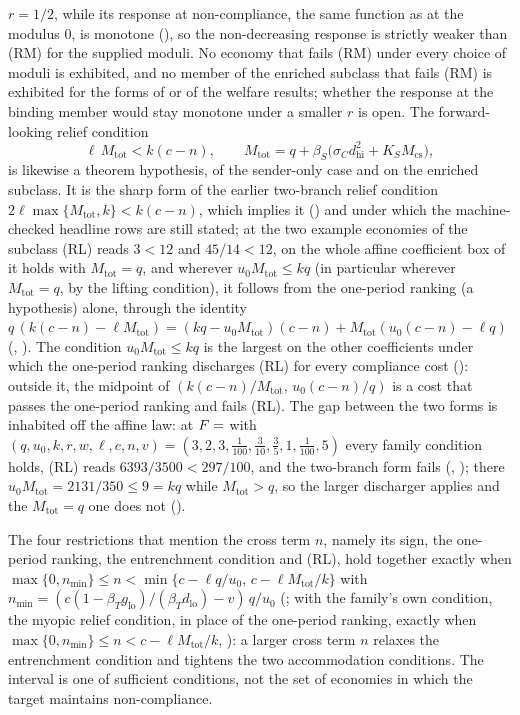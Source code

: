 $r=1/2$, while its response at non-compliance, the same function as at the modulus
$0$, is monotone (), so the
non-decreasing response is strictly weaker than (RM) for the supplied moduli.
No economy that fails (RM) under every choice of moduli is exhibited, and no
member of the enriched subclass that fails (RM) is exhibited for the forms of
 or of the welfare results; whether the response at the binding member would stay
monotone under a smaller $r$ is open. The forward-looking relief
condition
\[
\ell\,M_{\mathrm{tot}}<k(c-n),\qquad
M_{\mathrm{tot}}=q+\beta_S\bigl(\sigma_Cd_{\mathrm{hi}}^2+K_SM_{\mathrm{cs}}\bigr),
\tag{RL}
\]
is likewise a theorem hypothesis, of the sender-only case and
 on the enriched subclass. It is the sharp form of the
earlier two-branch relief condition $2\ell\max\{M_{\mathrm{tot}},k\}<k(c-n)$, which
implies it () and under which the machine-checked
headline rows are still stated; at the two example economies of the subclass (RL) reads
$3<12$ and $45/14<12$, on the whole affine coefficient box of
 it holds with $M_{\mathrm{tot}}=q$, and wherever
$u_0M_{\mathrm{tot}}\le kq$ (in particular wherever $M_{\mathrm{tot}}=q$,
by the lifting condition), it follows from the one-period ranking (a hypothesis) alone, through the identity
$q\,(k(c-n)-\ell M_{\mathrm{tot}})=(kq-u_0M_{\mathrm{tot}})(c-n)+M_{\mathrm{tot}}(u_0(c-n)-\ell q)$
(, ).
The condition $u_0M_{\mathrm{tot}}\le kq$ is the largest on the other
coefficients under which the one-period ranking discharges (RL) for every compliance cost
(): outside it, the midpoint of
$(k(c-n)/M_{\mathrm{tot}},\,u_0(c-n)/q)$ is a cost that passes the one-period ranking and
fails (RL).
The gap between the two forms is inhabited
off the affine law: at $F=$  with
$(q,u_0,k,r,w,\ell,c,n,v)=(3,2,3,\tfrac1{100},\tfrac3{10},\tfrac35,1,\tfrac1{100},5)$
every family condition holds, (RL) reads $6393/3500<297/100$, and the two-branch
form fails (,
); there
$u_0M_{\mathrm{tot}}=2131/350\le9=kq$ while $M_{\mathrm{tot}}>q$, so the
larger discharger applies and the $M_{\mathrm{tot}}=q$ one does not
().

The four restrictions that mention the cross term $n$, namely its sign, the
one-period ranking, the entrenchment condition and (RL), hold together exactly when
$\max\{0,n_{\min}\}\le n<\min\{c-\ell q/u_0,\,c-\ell M_{\mathrm{tot}}/k\}$
with $n_{\min}=(c(1-\beta_Tg_{\mathrm{lo}})/(\beta_Td_{\mathrm{lo}})-v)\,q/u_0$
(; with the family's own condition, the
myopic relief condition, in place of the one-period ranking, exactly when
$\max\{0,n_{\min}\}\le n<c-\ell M_{\mathrm{tot}}/k$,
): a larger cross term $n$ relaxes the
entrenchment condition and tightens the two accommodation conditions. The interval is one of
sufficient conditions, not the set of economies in which the target maintains non-compliance.

